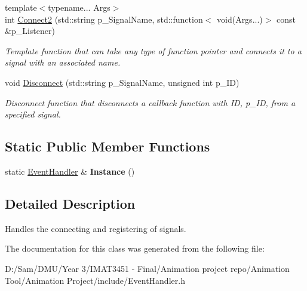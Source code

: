 \begin{DoxyCompactItemize}
\mbox{\label{class_event_handler_a53fc1f2852e49aedb4cfe766bbc80b6f}} 
{\footnotesize template$<$typename... Args$>$ }\\int \hyperlink{class_event_handler_a53fc1f2852e49aedb4cfe766bbc80b6f}{Connect2} (std\+::string p\+\_\+\+Signal\+Name, std\+::function$<$ void(Args...)$>$ const \&p\+\_\+\+Listener)
\begin{DoxyCompactList}\small\item\em Template function that can take any type of function pointer and connects it to a signal with an associated name. \end{DoxyCompactList}\item 
\mbox{\label{class_event_handler_a76ee03c87cfebc9f2bdb4d15a1d3d3b6}} 
void \hyperlink{class_event_handler_a76ee03c87cfebc9f2bdb4d15a1d3d3b6}{Disconnect} (std\+::string p\+\_\+\+Signal\+Name, unsigned int p\+\_\+\+ID)
\begin{DoxyCompactList}\small\item\em Disconnect function that disconnects a callback function with ID, p\+\_\+\+ID, from a specified signal. \end{DoxyCompactList}\end{DoxyCompactItemize}
\subsection*{Static Public Member Functions}
\begin{DoxyCompactItemize}
\item 
\mbox{\label{class_event_handler_ace8f196c90d62a0c22a07845fc6e8ff0}} 
static \hyperlink{class_event_handler}{Event\+Handler} \& {\bfseries Instance} ()
\end{DoxyCompactItemize}


\subsection{Detailed Description}
Handles the connecting and registering of signals. 

The documentation for this class was generated from the following file\+:\begin{DoxyCompactItemize}
\item 
D\+:/\+Sam/\+D\+M\+U/\+Year 3/\+I\+M\+A\+T3451 -\/ Final/\+Animation project repo/\+Animation Tool/\+Animation Project/include/Event\+Handler.\+h\end{DoxyCompactItemize}
